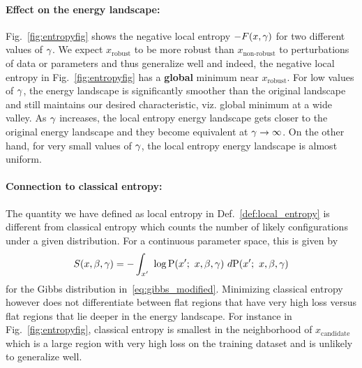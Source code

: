 \documentclass[10pt]{article}
\newcommand{\ignore}[1]{}
\begin{document}
\paragraph{Effect on the energy landscape:}
Fig.~\ref{fig:entropyfig} shows the negative local entropy $-F(x, \gamma)$ for two different values of $\gamma$. We expect $x_{\textrm{robust}}$ to be more robust than $x_{\textrm{non-robust}}$ to perturbations of data or parameters and thus generalize well and indeed, the negative local entropy in Fig.~\ref{fig:entropyfig} has a \textbf{global} minimum near $x_{\textrm{robust}}$. For low values of $\gamma$, the energy landscape is significantly smoother than the original landscape and still maintains our desired characteristic, viz. global minimum at a wide valley. As $\gamma$ increases, the local entropy energy landscape gets closer to the original energy landscape and they become equivalent at $\gamma \to \infty$. On the other hand, for very small values of $\gamma$, the local entropy energy landscape is almost uniform.

\paragraph{Connection to classical entropy:}
The quantity we have defined as local entropy in Def.~\ref{def:local_entropy} is different from classical entropy which counts the number of likely configurations under a given distribution. For a continuous parameter space, this is given by
$$
    S(x, \beta, \gamma) = - \int_{x'}\ \log \mathrm{P}(x';\ x, \beta, \gamma)\ d \mathrm{P}(x';\ x, \beta, \gamma)
$$
for the Gibbs distribution in~\eqref{eq:gibbs_modified}. Minimizing classical entropy however does not differentiate between flat regions that have very high loss versus flat regions that lie deeper in the energy landscape. For instance in Fig.~\ref{fig:entropyfig}, classical entropy is smallest in the neighborhood of $x_{\textrm{candidate}}$ which is a large region with very high loss on the training dataset and is unlikely to generalize well.
\ignore{We could minimize a modified loss function of the form $f(x) + \lambda S(x, \g)$ whose gradient can be computed to be
$$
    \nabla \Big(f(x) + \lambda S(x, \g)\Big) = \nabla f(x) - \lambda \g\ \corr (g(x'),\ x-x');
$$
where we have defined the cross-correlation as
$$
    \corr (g(x'),\ x-x') := \ag{g(x')\ (x-x')} - \ag{g(x')}\ \ag{x-x'};
$$
with $g(x') = f(x') + \f{\g}{2}\ \norm{x-x'}^2_2$. The gradient of the entropy can again be estimated using Langevin dynamics. Practically, one then has to modulate the hyper-parameter $\lambda$ during the course of the training to first use the gradient $\nabla f(x)$ to make progress and then turn on the entropy term to scope dense clusters.}
\end{document}
